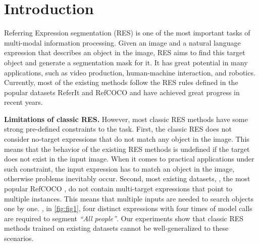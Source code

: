 \documentclass[10pt,twocolumn,letterpaper]{article}
\begin{document}
\section{Introduction}
\label{sec:intro}



Referring Expression segmentation (RES) is one of the most important tasks of multi-modal information processing. Given an image and a natural language expression that describes an object in the image, RES aims to find this target object and generate a segmentation mask for it. It has great potential in many applications, such as video production, human-machine interaction, and robotics. Currently, most of the existing methods follow the RES rules defined in the popular datasets ReferIt \cite{kazemzadeh-etal-2014-referitgame} and RefCOCO \cite{yu2016modeling,mao2016generation} and have achieved great progress in recent years. 

\textbf{Limitations of classic RES.} However, most classic RES methods have some strong pre-defined constraints to the task. First, the classic RES does not consider no-target expressions that do not match any object in the image. This means that the behavior of the existing RES methods is undefined if the target does not exist in the input image. When it comes to practical applications under such constraint, the input expression has to match an object in the image, otherwise problems inevitably occur. Second, most existing datasets, \eg, the most popular RefCOCO \cite{yu2016modeling,mao2016generation}, do not contain multi-target expressions that point to multiple instances. This means that multiple 
inputs are needed to search objects one by one. \Eg, in \cref{fig:fig1}, four distinct expressions with four times of model calls are required to segment \textit{``All people''}. Our experiments show that classic RES methods trained on existing datasets cannot be well-generalized to these scenarios.
\end{document}
